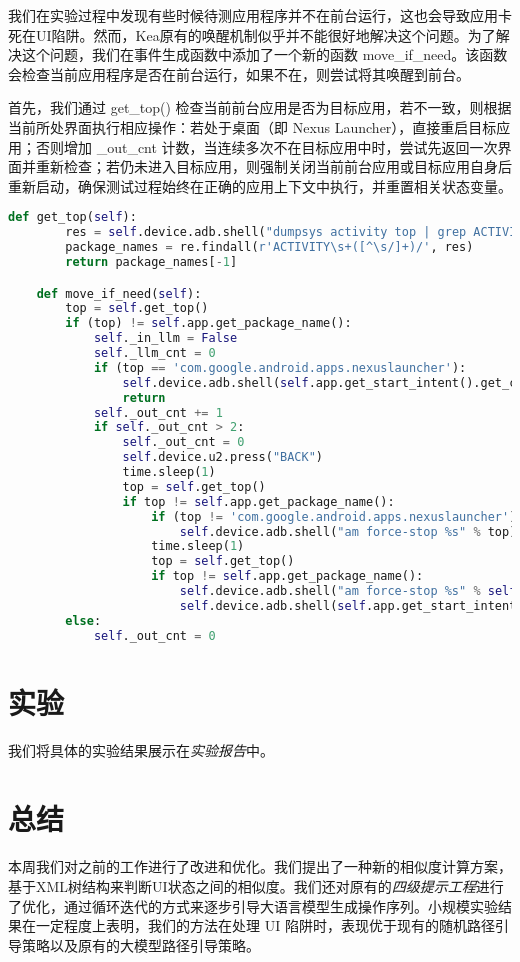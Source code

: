 \documentclass{article}
\begin{document}
我们在实验过程中发现有些时候待测应用程序并不在前台运行，这也会导致应用卡死在UI陷阱。然而，Kea原有的唤醒机制似乎并不能很好地解决这个问题。为了解决这个问题，我们在事件生成函数中添加了一个新的函数 move\_if\_need。该函数会检查当前应用程序是否在前台运行，如果不在，则尝试将其唤醒到前台。

首先，我们通过 get\_top() 检查当前前台应用是否为目标应用，若不一致，则根据当前所处界面执行相应操作：若处于桌面（即 Nexus Launcher），直接重启目标应用；否则增加 \_out\_cnt 计数，当连续多次不在目标应用中时，尝试先返回一次界面并重新检查；若仍未进入目标应用，则强制关闭当前前台应用或目标应用自身后重新启动，确保测试过程始终在正确的应用上下文中执行，并重置相关状态变量。

\begin{lstlisting}[language=python, caption=唤起应用]
    def get_top(self):
        res = self.device.adb.shell("dumpsys activity top | grep ACTIVITY")
        package_names = re.findall(r'ACTIVITY\s+([^\s/]+)/', res)
        return package_names[-1]

    def move_if_need(self):
        top = self.get_top()
        if (top) != self.app.get_package_name():
            self._in_llm = False
            self._llm_cnt = 0
            if (top == 'com.google.android.apps.nexuslauncher'):
                self.device.adb.shell(self.app.get_start_intent().get_cmd())
                return
            self._out_cnt += 1
            if self._out_cnt > 2:
                self._out_cnt = 0
                self.device.u2.press("BACK")
                time.sleep(1)
                top = self.get_top()
                if top != self.app.get_package_name():
                    if (top != 'com.google.android.apps.nexuslauncher'):
                        self.device.adb.shell("am force-stop %s" % top)
                    time.sleep(1)
                    top = self.get_top()
                    if top != self.app.get_package_name():
                        self.device.adb.shell("am force-stop %s" % self.app.get_package_name())
                        self.device.adb.shell(self.app.get_start_intent().get_cmd())
        else:
            self._out_cnt = 0
\end{lstlisting}

\section{实验}

我们将具体的实验结果展示在\textit{实验报告}中。

\section{总结}

本周我们对之前的工作进行了改进和优化。我们提出了一种新的相似度计算方案，基于XML树结构来判断UI状态之间的相似度。我们还对原有的\textit{四级提示工程}进行了优化，通过循环迭代的方式来逐步引导大语言模型生成操作序列。小规模实验结果在一定程度上表明，我们的方法在处理 UI 陷阱时，表现优于现有的随机路径引导策略以及原有的大模型路径引导策略。
\end{document}
